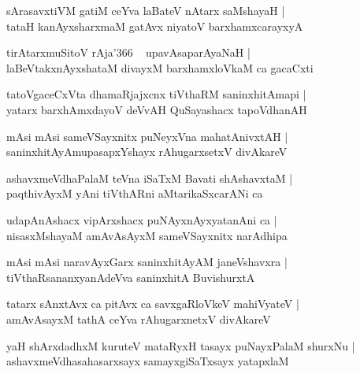 \documentclass[twoside,12pt,openright]{book}
\newcounter{shloka}[chapter]
\begin{document}
\begin{shloka}
sArasavxtiVM gatiM ceYva laBateV nAtarx saMshayaH |\\
tataH kanAyxsharxmaM gatAvx niyatoV barxhamxcarayxyA 
\end{shloka}

\begin{shloka}
tirAtarxmuSitoV rAja\char'366 ~ upavAsaparAyaNaH |\\
laBeVtakxnAyxshataM divayxM barxhamxloVkaM ca gacaCxti 
\end{shloka}

\begin{shloka}
tatoVgaceCxVta dhamaRjajxcnx tiVthaRM saninxhitAmapi |\\
yatarx barxhAmxdayoV deVvAH QuSayashacx tapoVdhanAH 
\end{shloka}

\begin{shloka}
mAsi mAsi sameVSayxnitx puNeyxVna mahatAnivxtAH |\\
saninxhitAyAmupasapxYshayx rAhugarxsetxV divAkareV 
\end{shloka}

\begin{shloka}
ashavxmeVdhaPalaM teVna iSaTxM Bavati shAshavxtaM |\\
paqthivAyxM yAni tiVthARni aMtarikaSxcarANi ca 
\end{shloka}

\begin{shloka}
udapAnAshacx vipArxshacx puNAyxnAyxyatanAni ca |\\
nisasxMshayaM amAvAsAyxM sameVSayxnitx narAdhipa 
\end{shloka}

\begin{shloka}
mAsi mAsi naravAyxGarx saninxhitAyAM  janeVshavxra |\\
tiVthaRsananxyanAdeVva saninxhitA BuvishurxtA 
\end{shloka}

\begin{shloka}
tatarx sAnxtAvx ca pitAvx ca savxgaRloVkeV mahiVyateV |\\
amAvAsayxM tathA ceYva rAhugarxnetxV divAkareV
\end{shloka}

\begin{shloka}
yaH shArxdadhxM kuruteV mataRyxH tasayx puNayxPalaM shurxNu |\\
ashavxmeVdhasahasarxsayx samayxgiSaTxsayx yatapxlaM 
\end{shloka}
\end{document}
